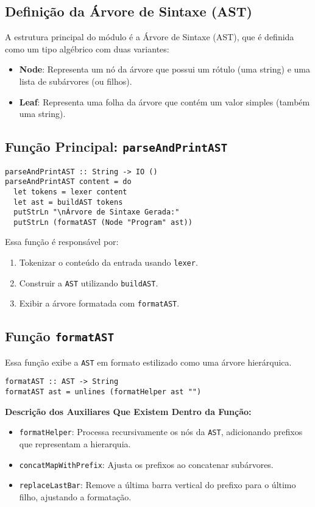 \documentclass{article}
\begin{document}
\subsection{Definição da Árvore de Sintaxe (AST)}

A estrutura principal do módulo é a Árvore de Sintaxe (AST), que é definida como um tipo algébrico com duas variantes:

\begin{itemize}
    \item \textbf{Node}: Representa um nó da árvore que possui um rótulo (uma string) e uma lista de subárvores (ou filhos). 
    \item \textbf{Leaf}: Representa uma folha da árvore que contém um valor simples (também uma string).
\end{itemize}

\subsection{Função Principal: \texttt{parseAndPrintAST}}
\begin{verbatim}
parseAndPrintAST :: String -> IO ()
parseAndPrintAST content = do
  let tokens = lexer content
  let ast = buildAST tokens
  putStrLn "\nÁrvore de Sintaxe Gerada:"
  putStrLn (formatAST (Node "Program" ast))
\end{verbatim}

Essa função é responsável por:
\begin{enumerate}
    \item Tokenizar o conteúdo da entrada usando \texttt{lexer}.
    \item Construir a \texttt{AST} utilizando \texttt{buildAST}.
    \item Exibir a árvore formatada com \texttt{formatAST}.
\end{enumerate}

\newpage
\subsection{Função \texttt{formatAST}}
Essa função exibe a \texttt{AST} em formato estilizado como uma árvore hierárquica. 
\begin{verbatim}
formatAST :: AST -> String
formatAST ast = unlines (formatHelper ast "")
\end{verbatim}

\textbf{Descrição dos Auxiliares Que Existem Dentro da Função:}
\begin{itemize}
    \item \texttt{formatHelper}: Processa recursivamente os nós da \texttt{AST}, adicionando prefixos que representam a hierarquia.
    \item \texttt{concatMapWithPrefix}: Ajusta os prefixos ao concatenar subárvores.
    \item \texttt{replaceLastBar}: Remove a última barra vertical do prefixo para o último filho, ajustando a formatação.
\end{itemize}
\end{document}
